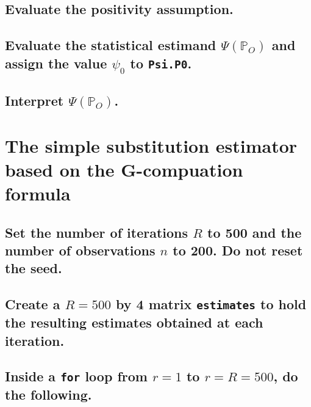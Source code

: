 \documentclass{article}\usepackage[]{graphicx}\usepackage[]{xcolor}
\begin{document}
  \subsection{Evaluate the positivity assumption.}
  
  \subsection{Evaluate the statistical estimand $\Psi(\mathbb{P}_O)$ and assign the value $\psi_0$ to \texttt{Psi.P0}.}
  
  \subsection{Interpret $\Psi(\mathbb{P}_O)$.}
  
\section{The simple substitution estimator based on the G-compuation formula}

  \subsection{Set the number of iterations $R$ to 500 and the number of observations $n$ to 200. Do not reset the seed.}
  
  \subsection{Create a $R = 500$ by 4 matrix \texttt{estimates} to hold the resulting estimates obtained at each iteration.}
  
  \subsection{Inside a \texttt{for} loop from $r = 1$ to $r = R = 500$, do the following.}
  
\end{document}

